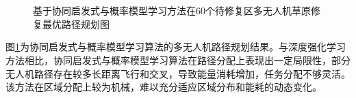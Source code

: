 \documentclass[AutoFakeBold]{LZUThesis}
\begin{document}
\begin{figure}[H]
	\centering
	\subfloat[500边长4机]{\label{fig:ILS_60_500_4}}
	\subfloat[500边长6机]{\label{fig:ILS_60_500_6}}
	\subfloat[500边长8机]{\label{fig:ILS_60_500_8}}\\
	\subfloat[500边长4机]{\label{fig:ILS_60_600_4}}
	\subfloat[500边长6机]{\label{fig:ILS_60_600_6}}
	\subfloat[500边长8机]{\label{fig:ILS_60_600_8}}\\
	\subfloat[500边长4机]{\label{fig:ILS_60_700_4}}
	\subfloat[500边长6机]{\label{fig:ILS_60_700_6}}
	\subfloat[500边长8机]{\label{fig:ILS_60_700_8}}
	\caption{基于协同启发式与概率模型学习方法在60个待修复区多无人机草原修复最优路径规划图}
	\label{fig:CHAPBILM_combined_uav_routes}
\end{figure}

图\ref{fig:CHAPBILM_combined_uav_routes}为协同启发式与概率模型学习算法的多无人机路径规划结果。与深度强化学习方法相比，协同启发式与概率模型学习算法在路径分配上表现出一定局限性，部分无人机路径存在较多长距离飞行和交叉，导致能量消耗增加，任务分配不够灵活。该方法在区域分配上较为机械，难以充分适应区域分布和能耗的动态变化。
\end{document}
